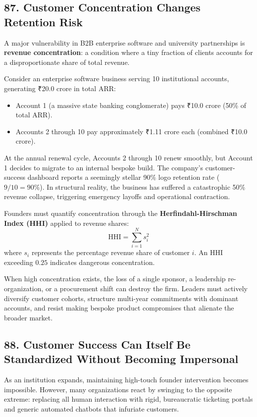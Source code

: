 \subsection*{87. Customer Concentration Changes Retention Risk}

A major vulnerability in B2B enterprise software and university partnerships is \textbf{revenue concentration}: a condition where a tiny fraction of clients accounts for a disproportionate share of total revenue.

Consider an enterprise software business serving 10 institutional accounts, generating ₹20.0 crore in total ARR:
\begin{itemize}[leftmargin=*]
\item Account 1 (a massive state banking conglomerate) pays ₹10.0 crore (50\% of total ARR).
\item Accounts 2 through 10 pay approximately ₹1.11 crore each (combined ₹10.0 crore).
\end{itemize}

At the annual renewal cycle, Accounts 2 through 10 renew smoothly, but Account 1 decides to migrate to an internal bespoke build. The company's customer-success dashboard reports a seemingly stellar 90\% logo retention rate ($9 / 10 = 90\%$). In structural reality, the business has suffered a catastrophic 50\% revenue collapse, triggering emergency layoffs and operational contraction.

Founders must quantify concentration through the \textbf{Herfindahl-Hirschman Index (HHI)} applied to revenue shares:
\begin{equation}
\text{HHI} = \sum_{i=1}^{N} s_i^2
\end{equation}
where $s_i$ represents the percentage revenue share of customer $i$. An HHI exceeding $0.25$ indicates dangerous concentration. 

When high concentration exists, the loss of a single sponsor, a leadership re-organization, or a procurement shift can destroy the firm. Leaders must actively diversify customer cohorts, structure multi-year commitments with dominant accounts, and resist making bespoke product compromises that alienate the broader market.

\subsection*{88. Customer Success Can Itself Be Standardized Without Becoming Impersonal}

As an institution expands, maintaining high-touch founder intervention becomes impossible. However, many organizations react by swinging to the opposite extreme: replacing all human interaction with rigid, bureaucratic ticketing portals and generic automated chatbots that infuriate customers.

